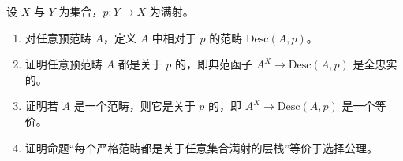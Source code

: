 \begin{ex}\label{ex:stack}
  设 $X$ 与 $Y$ 为集合，$p:Y\to X$ 为满射。
  \begin{enumerate}
  \item 对任意预范畴 $A$，定义 $A$ 中相对于 $p$ 的范畴 $\mathrm{Desc}(A,p)$。
  \item 证明任意预范畴 $A$ 都是关于 $p$ 的，即典范函子 $A^X \to \mathrm{Desc}(A,p)$ 是全忠实的。
  \item 证明若 $A$ 是一个范畴，则它是关于 $p$ 的，即 $A^X \to \mathrm{Desc}(A,p)$ 是一个等价。
  \item 证明命题“每个严格范畴都是关于任意集合满射的层栈”等价于选择公理。
  \end{enumerate}
\end{ex}

